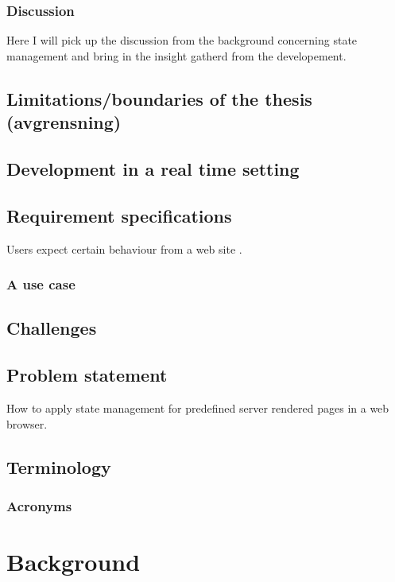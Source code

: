 \documentclass[english]{ifimaster}
\begin{document}
\subsection{Discussion}
Here I will pick up the discussion from the background concerning state management and bring in the insight gatherd from the developement.
\section{Limitations/boundaries of the thesis (avgrensning)}

\section{Development in a real time setting}




\section{Requirement specifications}
Users expect certain behaviour from a web site \parencite{mikowski}.
\subsection{A use case}




\section{Challenges}

\section{Problem statement}
How to apply state management for predefined server rendered pages in a web browser.

\section{Terminology}
\subsection{Acronyms}


\chapter{Background}
\end{document}

